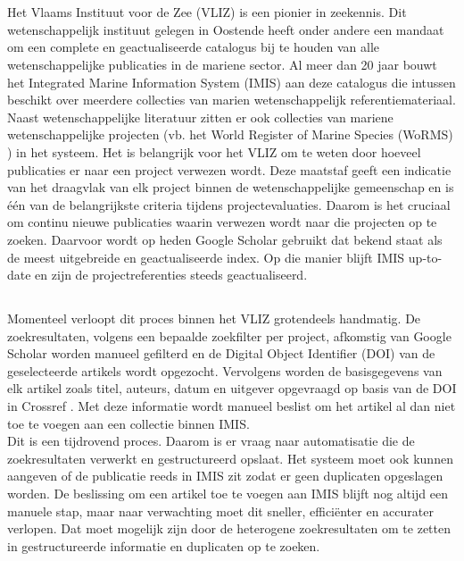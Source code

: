 
\chapter{}%
\label{ch:inleiding}

Het Vlaams Instituut voor de Zee (VLIZ) \autocite{Vliz2024} is een pionier in zeekennis. Dit wetenschappelijk instituut gelegen in Oostende heeft onder andere een mandaat om een complete en geactualiseerde catalogus bij te houden van alle wetenschappelijke publicaties in de mariene sector. Al meer dan 20 jaar bouwt het Integrated Marine Information System (IMIS) aan deze catalogus die intussen beschikt over meerdere collecties van marien wetenschappelijk referentiemateriaal.\\
Naast wetenschappelijke literatuur zitten er ook collecties van mariene wetenschappelijke projecten (vb. het World Register of Marine Species (WoRMS) \autocite{Worms2024}) in het systeem. Het is belangrijk voor het VLIZ om te weten door hoeveel publicaties er naar een project verwezen wordt. Deze maatstaf geeft een indicatie van het draagvlak van elk project binnen de wetenschappelijke gemeenschap en is één van de belangrijkste criteria tijdens projectevaluaties. Daarom is het cruciaal om continu nieuwe publicaties waarin verwezen wordt naar die projecten op te zoeken. Daarvoor wordt op heden Google Scholar gebruikt dat bekend staat als de meest uitgebreide en geactualiseerde index. Op die manier blijft IMIS up-to-date en zijn de projectreferenties steeds geactualiseerd.

\section{}%
\label{sec:probleemstelling}

Momenteel verloopt dit proces binnen het VLIZ grotendeels handmatig. De zoekresultaten, volgens een bepaalde zoekfilter per project, afkomstig van Google Scholar worden manueel gefilterd en de Digital Object Identifier (DOI) van de geselecteerde artikels wordt opgezocht.
Vervolgens worden de basisgegevens van elk artikel zoals titel, auteurs, datum en uitgever opgevraagd op basis van de DOI in Crossref \autocite{Crossref2024}. Met deze informatie wordt manueel beslist om het artikel al dan niet toe te voegen aan een collectie binnen IMIS.\\
Dit is een tijdrovend proces. Daarom is er vraag naar automatisatie die de zoekresultaten verwerkt en gestructureerd opslaat. Het systeem moet ook kunnen aangeven of de publicatie reeds in IMIS zit zodat er geen duplicaten opgeslagen worden. De beslissing om een artikel toe te voegen aan IMIS blijft nog altijd een manuele stap, maar naar verwachting moet dit sneller, efficiënter en accurater verlopen. Dat moet mogelijk zijn door de heterogene zoekresultaten om te zetten in gestructureerde informatie en duplicaten op te zoeken.

